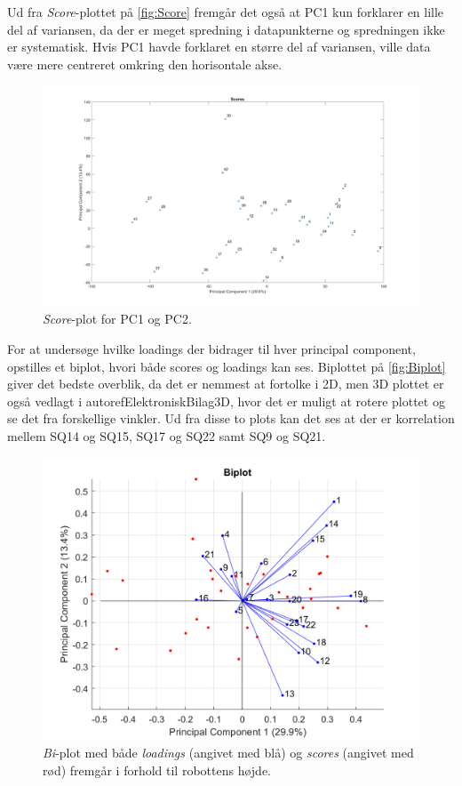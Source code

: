 Ud fra \textit{Score}-plottet på \autoref{fig:Score} fremgår det også at PC1 kun forklarer en lille del af variansen, da der er meget spredning i datapunkterne og spredningen ikke er systematisk. Hvis PC1 havde forklaret en større del af variansen, ville data være mere centreret omkring den horisontale akse.
%
\begin{figure}[H]
\centering
\includegraphics[width=\textwidth]{Figure/DatabehandlingSkalaer/PCAfigures/Scores}
\caption{\textit{Score}-plot for PC1 og PC2.}
\label{fig:Score}
\end{figure}
\noindent
%
For at undersøge hvilke loadings der bidrager til hver principal component, opstilles et biplot, hvori både scores og loadings kan ses. Biplottet på \autoref{fig:Biplot} giver det bedste overblik, da det er nemmest at fortolke i 2D, men 3D plottet er også vedlagt i autoref{ElektroniskBilag3D}, hvor det er muligt at rotere plottet og se det fra forskellige vinkler. Ud fra disse to plots kan det ses at der er korrelation mellem SQ14 og SQ15, SQ17 og SQ22 samt SQ9 og SQ21.
%
\begin{figure}[H]
\centering
\includegraphics[width=\textwidth]{Figure/DatabehandlingSkalaer/PCAfigures/Biplot}
\caption{\textit{Bi}-plot med både \textit{loadings} (angivet med blå) og \textit{scores} (angivet med rød) fremgår i forhold til robottens højde.}
\label{fig:Biplot}
\end{figure}
